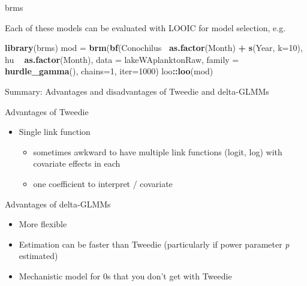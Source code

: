 \documentclass[ignorenonframetext,]{beamer}
\newenvironment{Shaded}{\begin{snugshade}}{\end{snugshade}}
\newcommand{\DataTypeTok}[1]{\textcolor[rgb]{0.13,0.29,0.53}{#1}}
\newcommand{\DecValTok}[1]{\textcolor[rgb]{0.00,0.00,0.81}{#1}}
\newcommand{\KeywordTok}[1]{\textcolor[rgb]{0.13,0.29,0.53}{\textbf{#1}}}
\newcommand{\NormalTok}[1]{#1}
\newcommand{\OperatorTok}[1]{\textcolor[rgb]{0.81,0.36,0.00}{\textbf{#1}}}
\newcommand{\StringTok}[1]{\textcolor[rgb]{0.31,0.60,0.02}{#1}}
\providecommand{\tightlist}{%
  \setlength{\itemsep}{0pt}\setlength{\parskip}{0pt}}
\begin{document}
\begin{frame}[fragile]{brms}
\protect\hypertarget{brms-3}{}

Each of these models can be evaluated with LOOIC for model selection,
e.g.

\begin{Shaded}
\begin{Highlighting}[]
\KeywordTok{library}\NormalTok{(brms)}
\NormalTok{mod =}\StringTok{ }\KeywordTok{brm}\NormalTok{(}\KeywordTok{bf}\NormalTok{(Conochilus}\OperatorTok{~}\StringTok{ }\KeywordTok{as.factor}\NormalTok{(Month) }\OperatorTok{+}\StringTok{ }\KeywordTok{s}\NormalTok{(Year, }\DataTypeTok{k=}\DecValTok{10}\NormalTok{), }
\NormalTok{       hu }\OperatorTok{~}\StringTok{ }\KeywordTok{as.factor}\NormalTok{(Month), }
      \DataTypeTok{data =}\NormalTok{ lakeWAplanktonRaw, }\DataTypeTok{family =} \KeywordTok{hurdle_gamma}\NormalTok{(), }
        \DataTypeTok{chains=}\DecValTok{1}\NormalTok{, }\DataTypeTok{iter=}\DecValTok{1000}\NormalTok{)}
\NormalTok{loo}\OperatorTok{::}\KeywordTok{loo}\NormalTok{(mod)}
\end{Highlighting}
\end{Shaded}

\end{frame}

\begin{frame}{Summary: Advantages and disadvantages of Tweedie and
delta-GLMMs}
\protect\hypertarget{summary-advantages-and-disadvantages-of-tweedie-and-delta-glmms}{}

Advantages of Tweedie

\begin{itemize}
\tightlist
\item
  Single link function

  \begin{itemize}
  \tightlist
  \item
    sometimes awkward to have multiple link functions (logit, log) with
    covariate effects in each
  \item
    one coefficient to interpret / covariate
  \end{itemize}
\end{itemize}

Advantages of delta-GLMMs

\begin{itemize}
\tightlist
\item
  More flexible
\item
  Estimation can be faster than Tweedie (particularly if power parameter
  \emph{p} estimated)
\item
  Mechanistic model for 0s that you don't get with Tweedie
\end{itemize}

\end{frame}
\end{document}
